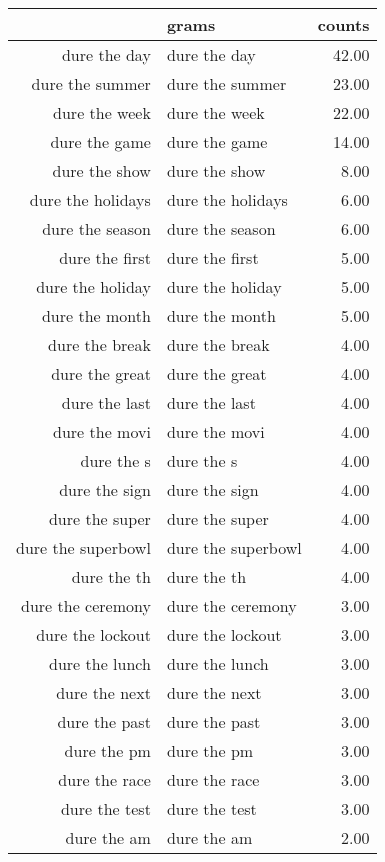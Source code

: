 \begin{table}[ht]
\centering
\begin{tabular}{rlr}
  \hline
 & grams & counts \\ 
  \hline
dure the day & dure the day & 42.00 \\ 
  dure the summer & dure the summer & 23.00 \\ 
  dure the week & dure the week & 22.00 \\ 
  dure the game & dure the game & 14.00 \\ 
  dure the show & dure the show & 8.00 \\ 
  dure the holidays & dure the holidays & 6.00 \\ 
  dure the season & dure the season & 6.00 \\ 
  dure the first & dure the first & 5.00 \\ 
  dure the holiday & dure the holiday & 5.00 \\ 
  dure the month & dure the month & 5.00 \\ 
  dure the break & dure the break & 4.00 \\ 
  dure the great & dure the great & 4.00 \\ 
  dure the last & dure the last & 4.00 \\ 
  dure the movi & dure the movi & 4.00 \\ 
  dure the s & dure the s & 4.00 \\ 
  dure the sign & dure the sign & 4.00 \\ 
  dure the super & dure the super & 4.00 \\ 
  dure the superbowl & dure the superbowl & 4.00 \\ 
  dure the th & dure the th & 4.00 \\ 
  dure the ceremony & dure the ceremony & 3.00 \\ 
  dure the lockout & dure the lockout & 3.00 \\ 
  dure the lunch & dure the lunch & 3.00 \\ 
  dure the next & dure the next & 3.00 \\ 
  dure the past & dure the past & 3.00 \\ 
  dure the pm & dure the pm & 3.00 \\ 
  dure the race & dure the race & 3.00 \\ 
  dure the test & dure the test & 3.00 \\ 
  dure the am & dure the am & 2.00 \\ 

\end{tabular}
\end{table}

